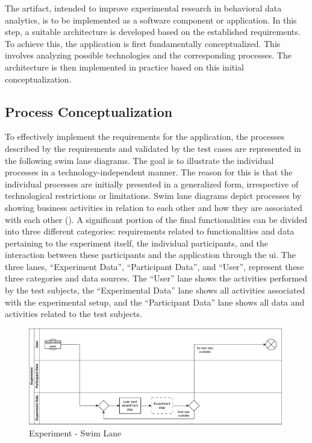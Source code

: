 The artifact, intended to improve experimental research in behavioral data analytics, is to be implemented as a software component or application. In this step, a suitable architecture is developed based on the established requirements. To achieve this, the application is first fundamentally conceptualized. This involves analyzing possible technologies and the corresponding processes. The architecture is then implemented in practice based on this initial conceptualization.

\subsection{Process Conceptualization}\label{subsec:ProcessConcept}

To effectively implement the requirements for the application, the processes described by the requirements and validated by the test cases are represented in the following swim lane diagrams. The goal is to illustrate the individual processes in a technology-independent manner. The reason for this is that the individual processes are initially presented in a generalized form, irrespective of technological restrictions or limitations. Swim lane diagrams depict processes by showing business activities in relation to each other and how they are associated with each other (\cite{Caudle.2009}). A significant portion of the final functionalities can be divided into three different categories: requirements related to functionalities and data pertaining to the experiment itself, the individual participants, and the interaction between these participants and the application through the \ac{ui}. The three lanes, \enquote{Experiment Data}, \enquote{Participant Data}, and \enquote{User}, represent these three categories and data sources. The \enquote{User} lane shows the activities performed by the test subjects, the \enquote{Experimental Data} lane shows all activities associated with the experimental setup, and the \enquote{Participant Data} lane shows all data and activities related to the test subjects.


\begin{figure}[htbp]
    \centering
    \includegraphics[width=0.99\textwidth, keepaspectratio]{content/05_design_and_dev_artefacts/ExperimentSwimLane.drawio.pdf}
    \caption{Experiment - Swim Lane}    
    \label{fig:experimentSwimLane}
\end{figure}

